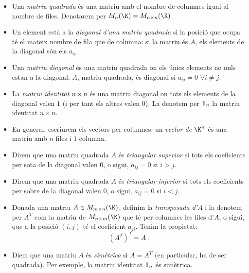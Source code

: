 \begin{itemize}
	\item Una \emph{matriu quadrada} és una matriu amb el nombre de columnes igual al nombre de files. Denotarem per $M_n(\K)=M_{n\times n}(\K)$.
	\item Un element està a la \emph{diagonal d'una matriu quadrada} si la posició que ocupa té el mateix nombre de fila que de columna: si la matriu és $A$, els elements de la diagonal són els $a_{ii}$.  
	\item Una \emph{matriu diagonal} és una matriu quadrada on els únics elements no nuls estan a la diagonal: $A$, matriu quadrada, és diagonal si $a_{ij}=0$ $\forall i\neq j$. 
	\item La \emph{matriu identitat $n\times n$} és una matriu diagonal on tots els elements de la diagonal valen $1$ (i per tant els altres valen $0$). La denotem per $\mathbf{1}_n$ la matriu identitat $n\times n$.
	\item En general, escriurem els vectors per columnes: un \emph{vector de $\K^n$} és una matriu amb $n$ files i $1$ columna.
	\item Direm que una matriu quadrada $A$ és \emph{triangular superior} si tots els coeficients per sota de la diagonal valen $0$, o sigui, $a_ {ij}=0$ si $i>j$.
	\item Direm que una matriu quadrada $A$ és \emph{triangular inferior} si tots els coeficients per sobre de la diagonal valen $0$, o sigui, $a_ {ij}=0$ si $i<j$.
	\item Donada una matriu $A \in M_{m\times n}(\K)$, definim la \emph{transposada d'$A$} i la denotem per $A^T$ com la matriu de $M_{n\times m}(\K)$ que té per columnes les files d'$A$, o sigui, que a la posició $(i,j)$ té el coeficient $a_{ji}$. Tenim la propietat:
	$$
	(A^T)^T=A \,.
	$$
	\item Diem que una matriu $A$ és \emph{simètrica} si $A=A^T$ (en particular, ha de ser quadrada). Per exemple, la matriu identitat $\mathbf{1}_n$ és simètrica.
\end{itemize}

